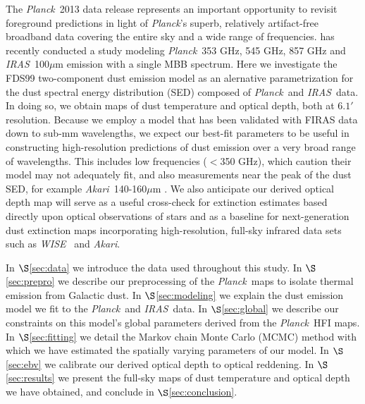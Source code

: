 \documentclass{emulateapj}
\newcommand{\IRAS}{{\it IRAS}}
\newcommand{\PLANCK}{{\it Planck}}
\newcommand{\AKARI}{{\it Akari}}
\newcommand{\WISE}{{\it WISE}}
\begin{document}


The \PLANCK~2013 data release \citep{planck2013} represents an important 
opportunity to revisit foreground predictions in light of \PLANCK's superb, 
relatively artifact-free broadband data covering the entire sky and a wide 
range of frequencies. \cite{planckdust} has recently conducted a study modeling
\PLANCK~353 GHz, 545 GHz, 857 GHz and \IRAS~100$\mu$m emission with a single
MBB spectrum. Here we investigate the FDS99 two-component dust emission model 
as an alernative parametrization for the dust spectral energy distribution 
(SED) composed  of \PLANCK~and \IRAS~data. In doing so, we obtain maps of dust 
temperature and optical depth, both at $6.1'$ resolution. Because we employ a 
model that has been validated with FIRAS data down to sub-mm wavelengths, we 
expect our best-fit parameters to be useful in constructing high-resolution 
predictions of dust emission over a very broad range of wavelengths. This 
includes low frequencies ($<$350 GHz), which \cite{planckdust} caution their 
model may not adequately fit, and also measurements near the peak of the dust 
SED, for example \AKARI~140-160$\mu$m \citep{akari}. We also anticipate our 
derived optical depth map will serve as a useful cross-check for extinction 
estimates based directly upon optical observations of stars
\citep[e.g.][]{green14} and as a baseline for next-generation dust extinction 
maps incorporating high-resolution, full-sky infrared data sets such as 
\WISE~\citep{wright10, meisner14} and \AKARI.


In $\S$\ref{sec:data} we introduce the data used throughout this study. In 
$\S$\ref{sec:prepro} we describe our preprocessing of the \PLANCK~maps to 
isolate thermal emission from Galactic dust. In $\S$\ref{sec:modeling} we 
explain the dust emission model we fit to the \PLANCK~and \IRAS~data. In 
$\S$\ref{sec:global} we describe our constraints on this model's global 
parameters derived from the \PLANCK~HFI maps. In $\S$\ref{sec:fitting} we 
detail the Markov chain Monte Carlo (MCMC) method with which we have estimated 
the spatially varying parameters of our model. In $\S$\ref{sec:ebv} we 
calibrate our derived optical depth to optical reddening. In 
$\S$\ref{sec:results} we present the full-sky maps of dust temperature and 
optical depth we have obtained, and conclude in $\S$\ref{sec:conclusion}.
\end{document}
